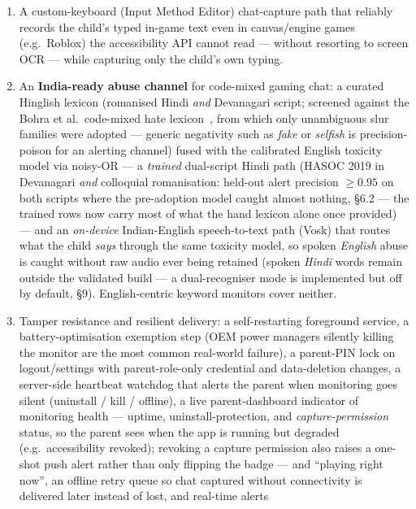 \documentclass[11pt,a4paper]{article}
\begin{document}
\begin{enumerate}[leftmargin=1.4em]
  \item A custom-keyboard (Input Method Editor) chat-capture path that reliably records
        the child's typed in-game text even in canvas/engine games (e.g.\ Roblox) the
        accessibility API cannot read --- without resorting to screen OCR --- while
        capturing only the child's own typing.
  \item An \textbf{India-ready abuse channel} for code-mixed gaming chat: a curated
        Hinglish lexicon (romanised Hindi \emph{and} Devanagari script; screened
        against the Bohra et al.\ code-mixed hate lexicon~\cite{bohra2018}, from
        which only unambiguous slur families were adopted --- generic negativity
        such as \emph{fake} or \emph{selfish} is precision-poison for an alerting
        channel) fused with the
        calibrated English toxicity model via noisy-OR --- a \emph{trained}
        dual-script Hindi path (HASOC 2019 in Devanagari \emph{and} colloquial
        romanisation: held-out alert precision $\geq$$0.95$ on both scripts where
        the pre-adoption model caught almost nothing, \S6.2 --- the trained rows
        now carry most of what the hand lexicon alone once provided) --- and an
        \emph{on-device} Indian-English speech-to-text path (Vosk) that routes what the
        child \emph{says} through the same toxicity model, so spoken \emph{English}
        abuse is caught without raw audio ever being retained (spoken \emph{Hindi}
        words remain outside the validated build --- a dual-recogniser mode is
        implemented but off by default, \S9). English-centric keyword monitors cover
        neither.
  \item Tamper resistance and resilient delivery: a self-restarting foreground service,
        a battery-optimisation exemption step (OEM power managers silently killing the
        monitor are the most common real-world failure), a parent-PIN lock on
        logout/settings with parent-role-only credential and data-deletion changes, a
        server-side heartbeat watchdog that alerts the parent when monitoring goes silent
        (uninstall / kill / offline), a live parent-dashboard indicator of monitoring
        health --- uptime, uninstall-protection, and \emph{capture-permission} status, so
        the parent sees when the app is running but degraded (e.g.\ accessibility revoked);
        revoking a capture permission also raises a one-shot push alert rather than only
        flipping the badge --- and ``playing right now'', an offline retry queue so chat captured
        without connectivity is delivered later instead of lost, and real-time alerts
$$
\end{enumerate}
\end{document}

